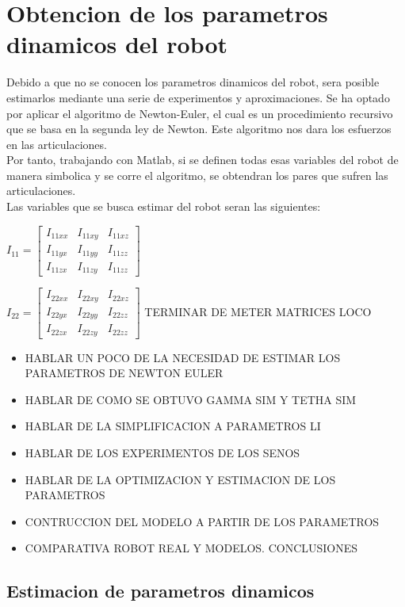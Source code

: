 \section{Obtencion de los parametros dinamicos del robot}
Debido a que no se conocen los parametros dinamicos del robot, sera posible estimarlos mediante una serie de experimentos y aproximaciones. Se ha optado por aplicar el algoritmo de Newton-Euler, el cual es un procedimiento recursivo que se basa en la segunda ley de Newton. Este algoritmo nos dara los esfuerzos en las articulaciones.\\
Por tanto, trabajando con Matlab, si se definen todas esas variables del robot de manera simbolica y se corre el algoritmo, se obtendran los pares que sufren las articulaciones.\\
Las variables que se busca estimar del robot seran las siguientes:
\begin{center}
		$ I_{11} =
	\begin{bmatrix}
	I_{11xx} & I_{11xy} & I_{11xz}\\
	I_{11yx} & I_{11yy} & I_{11zz}\\
	I_{11zx} & I_{11zy} & I_{11zz}
	\end{bmatrix} $

	$ I_{22} =
	\begin{bmatrix}
	I_{22xx} & I_{22xy} & I_{22xz}\\
	I_{22yx} & I_{22yy} & I_{22zz}\\
	I_{22zx} & I_{22zy} & I_{22zz}
	\end{bmatrix}$
TERMINAR DE METER MATRICES LOCO
\end{center}
\begin{itemize}
	\item HABLAR UN POCO DE LA NECESIDAD DE ESTIMAR LOS PARAMETROS DE NEWTON EULER
	\item HABLAR DE COMO SE OBTUVO GAMMA SIM Y TETHA SIM
	\item HABLAR DE LA SIMPLIFICACION A PARAMETROS LI
	\item HABLAR DE LOS EXPERIMENTOS DE LOS SENOS
	\item HABLAR DE LA OPTIMIZACION Y ESTIMACION DE LOS PARAMETROS
	\item CONTRUCCION DEL MODELO A PARTIR DE LOS PARAMETROS
	\item COMPARATIVA ROBOT REAL Y MODELOS. CONCLUSIONES
\end{itemize}
	\subsection{Estimacion de parametros dinamicos}
